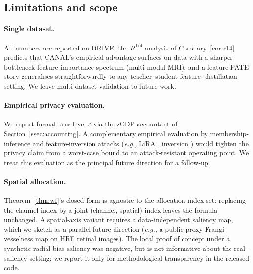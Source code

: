 \subsection{Limitations and scope}
\label{ssec:limitations}

\paragraph{Single dataset.} All numbers are reported on DRIVE; the
$R^{1/4}$ analysis of Corollary~\ref{cor:r14} predicts that CANAL's
empirical advantage surfaces on data with a sharper bottleneck-feature
importance spectrum (multi-modal MRI), and a feature-PATE story
generalises straightforwardly to any teacher--student feature-
distillation setting. We leave multi-dataset validation to future work.

\paragraph{Empirical privacy evaluation.} We report formal user-level
$\varepsilon$ via the zCDP accountant of Section~\ref{ssec:accounting}.
A complementary empirical evaluation by membership-inference and
feature-inversion attacks (\textit{e.g.,} LiRA \cite{carlini2022lira},
inversion \cite{dosovitskiy2016inverting}) would tighten the privacy
claim from a worst-case bound to an attack-resistant operating point.
We treat this evaluation as the principal future direction for a
follow-up.

\paragraph{Spatial allocation.} Theorem~\ref{thm:wf}'s closed form is
agnostic to the allocation index set: replacing the channel index by a
joint (channel, spatial) index leaves the formula unchanged. A
spatial-axis variant requires a data-independent saliency map, which
we sketch as a parallel future direction (\textit{e.g.,} a public-proxy
Frangi vesselness map on HRF retinal images). The local proof of
concept under a synthetic radial-bias saliency was negative, but is not
informative about the real-saliency setting; we report it only for
methodological transparency in the released code.


